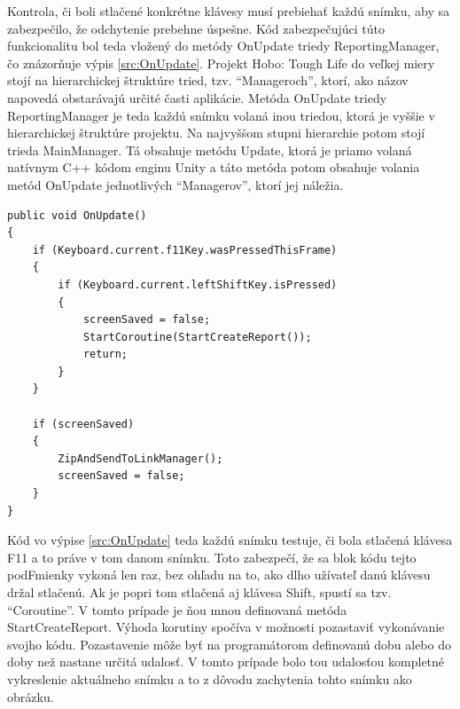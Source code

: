 \documentclass[slovak, bachelorpractice]{diploma}
\begin{document}
Kontrola, či boli stlačené konkrétne klávesy musí prebiehať každú snímku, aby sa zabezpečilo, že odchytenie prebehne úspešne. Kód zabezpečujúci túto funkcionalitu bol teda vložený do metódy OnUpdate triedy ReportingManager, čo znázorňuje výpis \ref{src:OnUpdate}. Projekt Hobo: Tough Life do veľkej miery stojí na hierarchickej štruktúre tried, tzv. \enquote{Manageroch}, ktorí, ako názov napovedá obstarávajú určité časti aplikácie. Metóda OnUpdate triedy ReportingManager je teda každú snímku volaná inou triedou, ktorá je vyššie v hierarchickej štruktúre projektu. Na najvyššom stupni hierarchie potom stojí trieda MainManager. Tá obsahuje metódu Update, ktorá je priamo volaná natívnym C++ kódom enginu Unity a táto metóda potom obsahuje volania metód OnUpdate jednotlivých \enquote{Managerov}, ktorí jej náležia.
\vspace{10pt}
\begin{lstlisting}[label=src:OnUpdate,caption={Metóda OnUpdate triedy ReportingManager}]
public void OnUpdate()
{
    if (Keyboard.current.f11Key.wasPressedThisFrame)
    {
        if (Keyboard.current.leftShiftKey.isPressed)
        {
            screenSaved = false;
            StartCoroutine(StartCreateReport());
            return;
        }
    }

    if (screenSaved)
    {
        ZipAndSendToLinkManager();
        screenSaved = false;
    }
}
\end{lstlisting}

Kód vo výpise \ref{src:OnUpdate} teda každú snímku testuje, či bola stlačená klávesa F11 a to práve v tom danom snímku. Toto zabezpečí, že sa blok kódu tejto podFmienky vykoná len raz, bez ohľadu na to, ako dlho užívateľ danú klávesu držal stlačenú. Ak je popri tom stlačená aj klávesa Shift, spustí sa tzv. \enquote{Coroutine}. V tomto prípade je ňou mnou definovaná metóda StartCreateReport. Výhoda korutiny spočíva v možnosti pozastaviť vykonávanie svojho kódu. Pozastavenie môže byť na programátorom definovanú dobu alebo do doby než nastane určitá udalosť. V tomto prípade bolo tou udalosťou kompletné vykreslenie aktuálneho snímku a to z dôvodu zachytenia tohto snímku ako obrázku.
\end{document}
